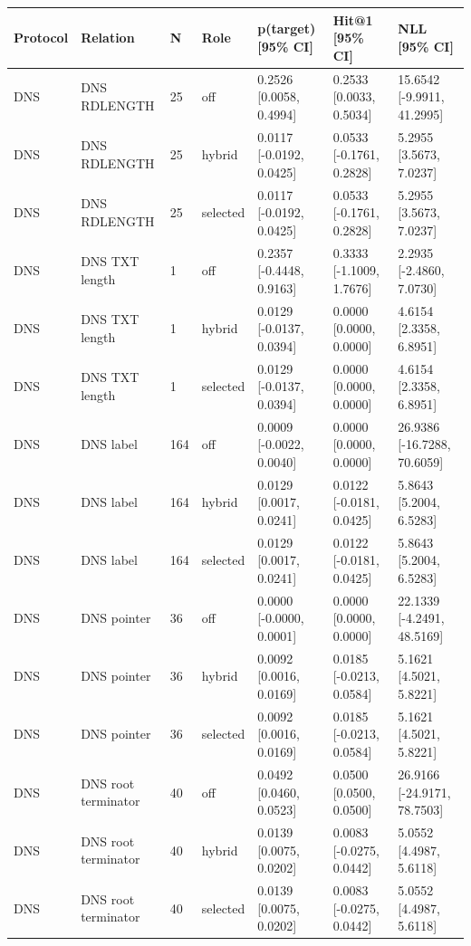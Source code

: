 \begin{tabular}{lllllll}
\hline
Protocol & Relation & N & Role & p(target) [95\% CI] & Hit@1 [95\% CI] & NLL [95\% CI] \\
\hline
DNS & DNS RDLENGTH & 25 & off & 0.2526 [0.0058, 0.4994] & 0.2533 [0.0033, 0.5034] & 15.6542 [-9.9911, 41.2995] \\
DNS & DNS RDLENGTH & 25 & hybrid & 0.0117 [-0.0192, 0.0425] & 0.0533 [-0.1761, 0.2828] & 5.2955 [3.5673, 7.0237] \\
DNS & DNS RDLENGTH & 25 & selected & 0.0117 [-0.0192, 0.0425] & 0.0533 [-0.1761, 0.2828] & 5.2955 [3.5673, 7.0237] \\
DNS & DNS TXT length & 1 & off & 0.2357 [-0.4448, 0.9163] & 0.3333 [-1.1009, 1.7676] & 2.2935 [-2.4860, 7.0730] \\
DNS & DNS TXT length & 1 & hybrid & 0.0129 [-0.0137, 0.0394] & 0.0000 [0.0000, 0.0000] & 4.6154 [2.3358, 6.8951] \\
DNS & DNS TXT length & 1 & selected & 0.0129 [-0.0137, 0.0394] & 0.0000 [0.0000, 0.0000] & 4.6154 [2.3358, 6.8951] \\
DNS & DNS label & 164 & off & 0.0009 [-0.0022, 0.0040] & 0.0000 [0.0000, 0.0000] & 26.9386 [-16.7288, 70.6059] \\
DNS & DNS label & 164 & hybrid & 0.0129 [0.0017, 0.0241] & 0.0122 [-0.0181, 0.0425] & 5.8643 [5.2004, 6.5283] \\
DNS & DNS label & 164 & selected & 0.0129 [0.0017, 0.0241] & 0.0122 [-0.0181, 0.0425] & 5.8643 [5.2004, 6.5283] \\
DNS & DNS pointer & 36 & off & 0.0000 [-0.0000, 0.0001] & 0.0000 [0.0000, 0.0000] & 22.1339 [-4.2491, 48.5169] \\
DNS & DNS pointer & 36 & hybrid & 0.0092 [0.0016, 0.0169] & 0.0185 [-0.0213, 0.0584] & 5.1621 [4.5021, 5.8221] \\
DNS & DNS pointer & 36 & selected & 0.0092 [0.0016, 0.0169] & 0.0185 [-0.0213, 0.0584] & 5.1621 [4.5021, 5.8221] \\
DNS & DNS root terminator & 40 & off & 0.0492 [0.0460, 0.0523] & 0.0500 [0.0500, 0.0500] & 26.9166 [-24.9171, 78.7503] \\
DNS & DNS root terminator & 40 & hybrid & 0.0139 [0.0075, 0.0202] & 0.0083 [-0.0275, 0.0442] & 5.0552 [4.4987, 5.6118] \\
DNS & DNS root terminator & 40 & selected & 0.0139 [0.0075, 0.0202] & 0.0083 [-0.0275, 0.0442] & 5.0552 [4.4987, 5.6118] \\

\end{tabular}
